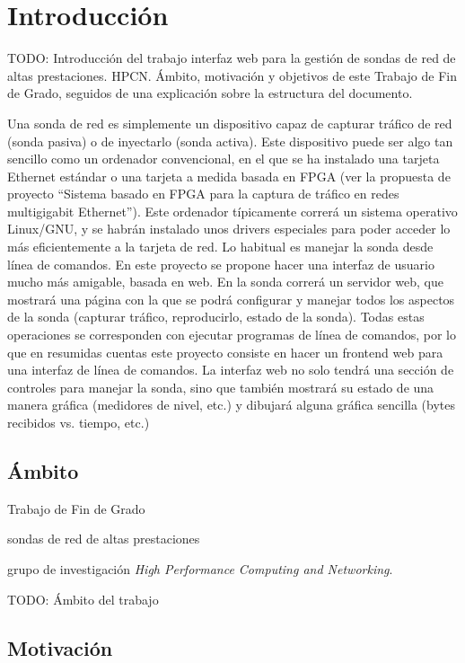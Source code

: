 \chapter{Introducción}

TODO: Introducción del trabajo
interfaz web para la gestión de sondas de red de altas prestaciones. HPCN. Ámbito, motivación y objetivos de este Trabajo de Fin de Grado, seguidos de una explicación sobre la estructura del documento.

Una sonda de red es simplemente un dispositivo capaz de capturar tráfico de red (sonda
pasiva) o de inyectarlo (sonda activa). Este dispositivo puede ser algo tan sencillo
como un ordenador convencional, en el que se ha instalado una tarjeta Ethernet
estándar o una tarjeta a medida basada en FPGA (ver la propuesta de proyecto
“Sistema basado en FPGA para la captura de tráfico en redes multigigabit Ethernet”).
Este ordenador típicamente correrá un sistema operativo Linux/GNU, y se habrán
instalado unos drivers especiales para poder acceder lo más eficientemente a la tarjeta
de red. Lo habitual es manejar la sonda desde línea de comandos. En este proyecto se
propone hacer una interfaz de usuario mucho más amigable, basada en web. En la
sonda correrá un servidor web, que mostrará una página con la que se podrá configurar
y manejar todos los aspectos de la sonda (capturar tráfico, reproducirlo, estado de la
sonda). Todas estas operaciones se corresponden con ejecutar programas de línea de
comandos, por lo que en resumidas cuentas este proyecto consiste en hacer un frontend
web para una interfaz de línea de comandos.
La interfaz web no solo tendrá una sección de controles para manejar la sonda, sino que
también mostrará su estado de una manera gráfica (medidores de nivel, etc.) y dibujará
alguna gráfica sencilla (bytes recibidos vs. tiempo, etc.)


\section{\'Ambito}

Trabajo de Fin de Grado

 sondas de red de altas prestaciones

grupo de investigación \textit{High Performance Computing and Networking}. 

TODO: Ámbito del trabajo


\section{Motivación}

